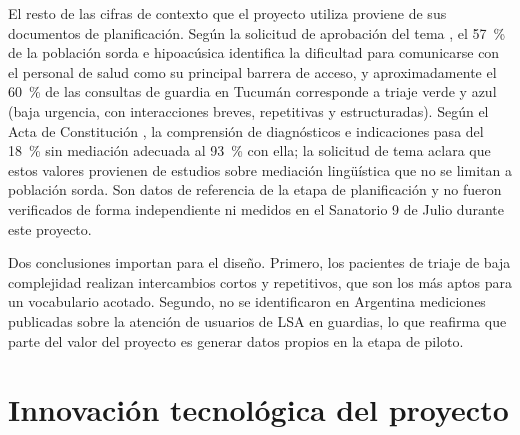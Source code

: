 El resto de las cifras de contexto que el proyecto utiliza proviene de sus documentos de planificación. Según la solicitud de aprobación del tema \parencite{solicitudtema2026}, el 57~\% de la población sorda e hipoacúsica identifica la dificultad para comunicarse con el personal de salud como su principal barrera de acceso, y aproximadamente el 60~\% de las consultas de guardia en Tucumán corresponde a triaje verde y azul (baja urgencia, con interacciones breves, repetitivas y estructuradas). Según el Acta de Constitución \parencite{actaconstitucion2026}, la comprensión de diagnósticos e indicaciones pasa del 18~\% sin mediación adecuada al 93~\% con ella; la solicitud de tema aclara que estos valores provienen de estudios sobre mediación lingüística que no se limitan a población sorda. Son datos de referencia de la etapa de planificación y no fueron verificados de forma independiente ni medidos en el Sanatorio 9 de Julio durante este proyecto.

Dos conclusiones importan para el diseño. Primero, los pacientes de triaje de baja complejidad realizan intercambios cortos y repetitivos, que son los más aptos para un vocabulario acotado. Segundo, no se identificaron en Argentina mediciones publicadas sobre la atención de usuarios de LSA en guardias, lo que reafirma que parte del valor del proyecto es generar datos propios en la etapa de piloto.

\section{Innovación tecnológica del proyecto}

